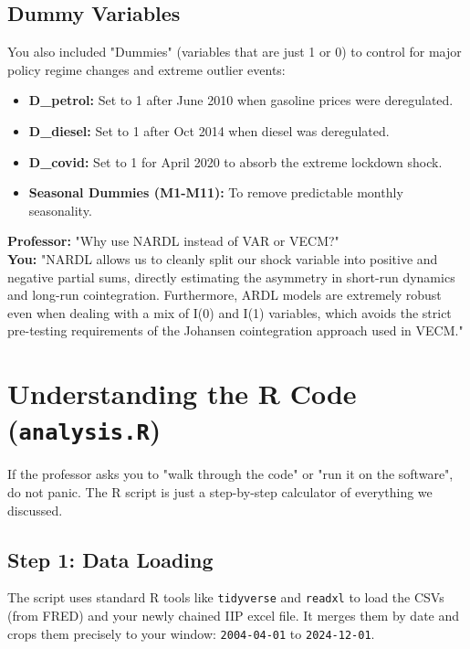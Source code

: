 \documentclass[12pt,a4paper]{report}
\begin{document}
\section{Dummy Variables}
You also included "Dummies" (variables that are just 1 or 0) to control for major policy regime changes and extreme outlier events:
\begin{itemize}
    \item \textbf{D\_petrol:} Set to 1 after June 2010 when gasoline prices were deregulated.
    \item \textbf{D\_diesel:} Set to 1 after Oct 2014 when diesel was deregulated.
    \item \textbf{D\_covid:} Set to 1 for April 2020 to absorb the extreme lockdown shock.
    \item \textbf{Seasonal Dummies (M1-M11):} To remove predictable monthly seasonality.
\end{itemize}

\textbf{Professor:} "Why use NARDL instead of VAR or VECM?"\\
\textbf{You:} "NARDL allows us to cleanly split our shock variable into positive and negative partial sums, directly estimating the asymmetry in short-run dynamics and long-run cointegration. Furthermore, ARDL models are extremely robust even when dealing with a mix of I(0) and I(1) variables, which avoids the strict pre-testing requirements of the Johansen cointegration approach used in VECM."

\newpage
\chapter{Understanding the R Code (\texttt{analysis.R})}
If the professor asks you to "walk through the code" or "run it on the software", do not panic. The R script is just a step-by-step calculator of everything we discussed. 

\section{Step 1: Data Loading}
The script uses standard R tools like \texttt{tidyverse} and \texttt{readxl} to load the CSVs (from FRED) and your newly chained IIP excel file. It merges them by date and crops them precisely to your window: \texttt{2004-04-01} to \texttt{2024-12-01}.
\end{document}
